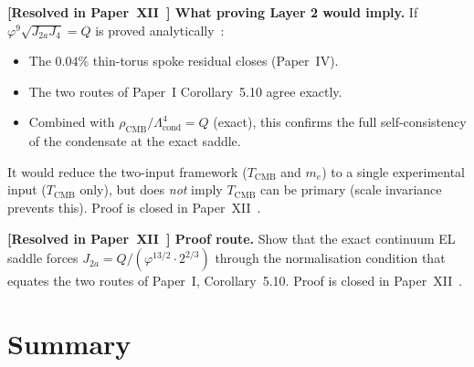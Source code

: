 \documentclass[11pt,a4paper]{article}
\theoremstyle{definition}
\theoremstyle{remark}
\newcommand{\vp}{\varphi}
\newcommand{\TCMB}{T_{\mathrm{CMB}}}
\newcommand{\rCMB}{\rho_{\mathrm{CMB}}}
\newcommand{\Lcond}{\Lambda_{\mathrm{cond}}}
\newcommand{\Ja}{J_{2a}}
\newcommand{\Jfour}{J_{4}}
\begin{document}
\begin{enumerate}[noitemsep]
  \textbf{[Resolved in Paper~XII~\cite{Paper12}] What proving Layer 2 would imply.}
  If $\vp^9\sqrt{\Ja\Jfour}=Q$ is proved analytically~\cite{Paper2,Paper3}:
  \begin{itemize}[noitemsep]
    \item The $0.04\%$ thin-torus spoke residual closes (Paper~IV).
    \item The two routes of Paper~I Corollary~5.10 agree exactly.
    \item Combined with $\rCMB/\Lcond^4=Q$ (exact), this confirms the
      full self-consistency of the condensate at the exact saddle.
  \end{itemize}
  It would reduce the two-input framework ($\TCMB$ and $m_e$) to
  a single experimental input ($\TCMB$ only), but does \emph{not}
  imply $\TCMB$ can be primary (scale invariance prevents this). Proof is closed in Paper~XII~\cite{Paper12}.

  \textbf{[Resolved in Paper~XII~\cite{Paper12}] Proof route.}
  Show that the exact continuum EL saddle forces
  $\Ja = Q/(\vp^{13/2}\cdot 2^{2/3})$ through the normalisation
  condition that equates the two routes of Paper~I, Corollary~5.10. Proof is closed in Paper~XII~\cite{Paper12}.

\end{enumerate}

\section{Summary}
\label{P7:sec:summary}
\end{document}
